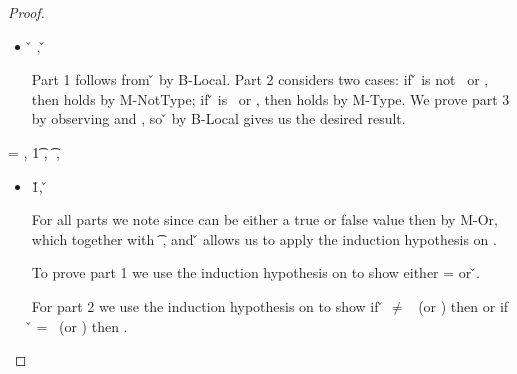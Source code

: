 \begin{lemma}
\begin{enumerate}
\begin{proof}
\begin{case}[T-Local]
\begin{itemize}
  \item[]
\begin{subcase}[B-Local]
{ \inopenv {\openv{}} {\x{}} {\v{}} },
{ \opsem {\openv{}} {\x{}} {\v{}} }

Part 1 follows from \inopenv{\openv{}}{\x{}} {\v{}} by B-Local.
Part 2 considers two cases: if \v{} is not \false\ or \nil, then 
\satisfies{\openv{}}{\notprop{\falsy}{\x{}}} holds by M-NotType; if \v{} is \false\ or \nil, then 
\satisfies{\openv{}}{\isprop{\falsy}{\x{}}} holds by M-Type.
We prove part 3 by observing
\inpropenv{\propenv{}}{\isprop{\t{}}{\x{}}}
and
\satisfies{\openv{}}{\propenv{}},
so
{ \inopenv {\openv{}} {\x{}} {\v{}} }
by B-Local
gives us the desired result.
\end{subcase}
\end{itemize}

\end{case}

\begin{case}[T-Do]
\e{} = { {}},
  \judgement {\propenv{}} 
             { {\t1}} 
             { {}} 
             {},
           { {\t{}}} 
           {\filterset {\thenprop {\prop{}}} {\elseprop {\prop{}}}} 
           {\object{}},

\begin{itemize}
  \item[] \begin{subcase}[B-Do]
  \opsem {\openv{}} {} {\v{1}},
  \opsem {\openv{}} {} {\v{}}

For all parts we note 
    since {} can be either a true or false value
    then
    {}
    by M-Or,
    which together with 
           { {\t{}}} 
           {\filterset {\thenprop {\prop{}}} {\elseprop {\prop{}}}} 
           {\object{}},
    and
  \opsem {\openv{}} {} {\v{}}
    allows us to apply the induction hypothesis on .

To prove part 1 we use the induction hypothesis on 
to show either \object{} = \emptyobject{} 
or \inopenv {\openv{}} {\object{}} {\v{}}.

For part 2 we use the induction hypothesis on 
to show if \v{} $\not=$ \false\ (or \nil) then
        {\satisfies{\openv{}}{\thenprop{\prop{}}}}
        or
  if \v{} = \false\ (or \nil) then
        {\satisfies{\openv{}}{\elseprop{\prop{}}}}.


\end{subcase}
\end{itemize}
\end{case}
\end{proof}
\end{enumerate}
\end{lemma}
